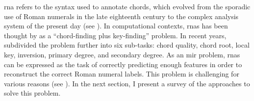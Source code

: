 

\gls{rna} refers to the syntax used to annotate chords,
which evolved from the sporadic use of Roman numerals in the
late eighteenth century to the complex analysis system of
the present day (see
). In
computational contexts, \glspl{rna} has been thought by
\textcite{temperley1997algorithm} as a ``chord-finding plus
key-finding'' problem. In recent years,
\textcite{chen2018functional} subdivided the problem further
into six sub-tasks: chord quality, chord root, local key,
inversion, primary degree, and secondary degree. As an
\gls{mir} problem, \glspl{rna} can be expressed as the task
of correctly predicting enough features in order to
reconstruct the correct Roman numeral labels. This problem
is challenging for various reasons (see
). In the next section, I present a
survey of the approaches to solve this problem.
